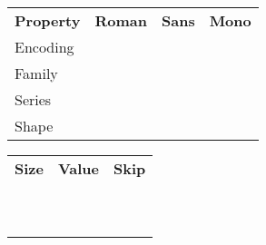 \makeatletter
\newcommand\thefontsize[1]{
  {\ttfamily\string#1}
  & #1\let\currentsize\f@size\normalsize\currentsize
  & #1\let\currentskip\f@baselineskip\normalsize\currentskip
  \\
}
\makeatother

\begin{center}
\begin{tabular}{@{}lrrr@{}}
  \textbf{Property} & \textbf{Roman} & \textbf{Sans} & \textbf{Mono} \\
  Encoding & \rmfamily\makeatletter\detokenize\expandafter{\f@encoding}\makeatother & \sffamily\makeatletter\detokenize\expandafter{\f@encoding}\makeatother & \ttfamily\makeatletter\detokenize\expandafter{\f@encoding}\makeatother \\
  Family &   \rmfamily\makeatletter\detokenize\expandafter{\f@family}\makeatother   & \sffamily\makeatletter\detokenize\expandafter{\f@family}\makeatother   & \ttfamily\makeatletter\detokenize\expandafter{\f@family}\makeatother   \\
  Series &   \rmfamily\makeatletter\detokenize\expandafter{\f@series}\makeatother   & \sffamily\makeatletter\detokenize\expandafter{\f@series}\makeatother   & \ttfamily\makeatletter\detokenize\expandafter{\f@series}\makeatother   \\
  Shape &    \rmfamily\makeatletter\detokenize\expandafter{\f@shape}\makeatother    & \sffamily\makeatletter\detokenize\expandafter{\f@shape}\makeatother    & \ttfamily\makeatletter\detokenize\expandafter{\f@shape}\makeatother    \\
\end{tabular}

\vspace*{1cm}

\begin{tabular}{@{}lrr@{}}
  \textbf{Size} & \textbf{Value} & \textbf{Skip} \\
  \thefontsize\tiny
  \thefontsize\scriptsize
  \thefontsize\footnotesize
  \thefontsize\small
  \thefontsize\normalsize
  \thefontsize\large
  \thefontsize\Large
  \thefontsize\LARGE
  \thefontsize\huge
  \thefontsize\Huge
\end{tabular}
\end{center}
